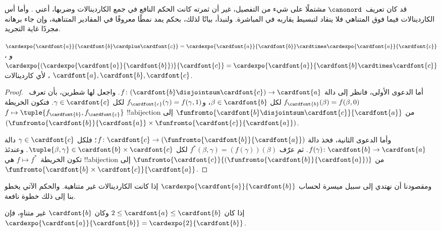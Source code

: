 \documentclass[../../../include/open-logic-section]{subfiles}
\begin{document}


قد كان تعريف~$\canonord$ مشتملًا على شيء من التفصيل، غير أن ثمرته
كانت الحكم النافع في جمع الكاردينالات وضربها، أعني
. وأما أس الكاردينالات فيما فوق المتناهي
فلا ينقاد لتبسيط يقاربه في المباشرة. ولنبدأ، بيانًا لذلك، بحكم يمد
نمطًا معروفًا في المقادير المتناهية، وإن جاء برهانه مجردًا غاية التجريد.

\begin{prop}
$\cardexpo{\cardfont{a}}{\cardfont{b} \cardplus \cardfont{c}} =
\cardexpo{\cardfont{a}}{\cardfont{b}} \cardtimes
\cardexpo{\cardfont{a}}{\cardfont{c}}$، و
$\cardexpo{(\cardexpo{\cardfont{a}}{\cardfont{b}})}{\cardfont{c}} =
\cardexpo{\cardfont{a}}{\cardfont{b} \cardtimes \cardfont{c}}$، لأي
كاردينالات $\cardfont{a}, \cardfont{b}, \cardfont{c}$.
\end{prop}

\begin{proof}
أما الدعوى الأولى، فانظر إلى دالة
$f \colon (\cardfont{b}\disjointsum\cardfont{c}) \to \cardfont{a}$.
واجعل لها شطرين، بأن تعرف~$f_\cardfont{b}(\beta) = f(\beta, 0)$ لكل
$\beta \in \cardfont{b}$، و$f_\cardfont{c}(\gamma) = f(\gamma, 1)$
لكل $\gamma \in \cardfont{c}$. فتكون الخريطة
$f \mapsto \tuple{f_{\cardfont{b}}, f_{\cardfont{c}}}$
!!a{bijection} من
$\funfromto{\cardfont{b} \disjointsum \cardfont{c}}{\cardfont{a}}$ إلى
$(\funfromto{\cardfont{b}}{\cardfont{a}} \times
\funfromto{\cardfont{c}}{\cardfont{a}})$.

وأما الدعوى الثانية، فخذ دالة
$f \colon \cardfont{c} \to
(\funfromto{\cardfont{b}}{\cardfont{a}})$؛ فلكل
$\gamma \in \cardfont{c}$ دالة
$f(\gamma) \colon \cardfont{b} \to \cardfont{a}$. ثم عرّف
$f^*(\beta, \gamma) = (f(\gamma))(\beta)$ لكل
$\tuple{\beta, \gamma} \in \cardfont{b} \times \cardfont{c}$.
وعندئذ تكون الخريطة~$f \mapsto f^*$ هي !!a{bijection} من
$\funfromto{\cardfont{c}}{(\funfromto{\cardfont{b}}{\cardfont{a}})}$
إلى $\funfromto{\cardfont{b} \times \cardfont{c}}{\cardfont{a}}$.
\end{proof}

ومقصودنا أن نهتدي إلى سبيل ميسرة لحساب
$\cardexpo{\cardfont{a}}{\cardfont{b}}$ إذا كانت الكاردينالات غير
متناهية. والحكم الآتي يخطو بنا إلى ذلك خطوة نافعة.

\begin{prop}
إذا كان $2 \leq \cardfont{a} \leq \cardfont{b}$ وكان
$\cardfont{b}$ غير متناهٍ، فإن
$\cardexpo{\cardfont{a}}{\cardfont{b}} =
\cardexpo{2}{\cardfont{b}}$.
\end{prop}
\end{document}
